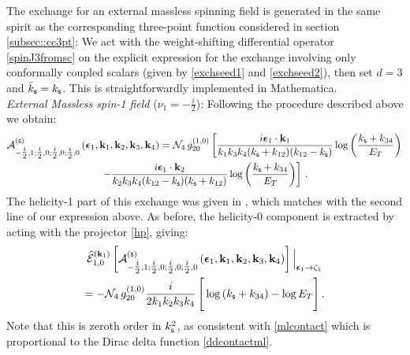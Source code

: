 \documentclass[11pt,a4paper]{article}
\begin{document}
The exchange for an external massless spinning field is generated in the same spirit as the corresponding three-point function considered in section \ref{subsec::cc3pt}: We act with the weight-shifting differential operator \eqref{spinJ3fromsc} on the explicit expression for the exchange involving only conformally coupled scalars (given by \eqref{exchseed1} and \eqref{exchseed2}), then set $d=3$ and ${\bar k}_{\sf s}=k_{\sf s}$. This is straightforwardly implemented in Mathematica. \\

\noindent \emph{External Massless spin-1 field} ($\nu_1=-\frac{i}{2}$): Following the procedure described above we obtain:
\begin{multline}
     {\cal A}^{\left({\sf s}\right)}_{-\tfrac{i}{2},1;\tfrac{i}{2},0;\tfrac{i}{2},0;\tfrac{i}{2},0}\left(\boldsymbol{\epsilon}_1, {\bf k}_1, {\bf k}_2,{\bf k}_3, {\bf k}_4\right)={\cal N}_4\,g_{20}^{(1,0)}\left[\frac{i \boldsymbol{\epsilon}_1\cdot\bold{k}_1 }{k_1 k_3 k_4 (k_{\sf s}+k_{12}) (k_{12}-k_{\sf s})}\log \left(\frac{k_{\sf s}+k_{34}}{E_T}\right)\right.\\\left.-\frac{i \boldsymbol{\epsilon}_1\cdot\bold{k}_2 }{k_2 k_3 k_4 (k_{12}-k_{\sf s}) (k_{\sf s}+k_{12})}\log \left(\frac{k_{\sf s}+k_{34}}{E_T}\right)\right]\,.
\end{multline}
The helicity-1 part of this exchange was given in \cite{Baumann:2020dch}, which matches with the second line of our expression above. As before, the helicity-0 component is extracted by acting with the projector \eqref{hp}, giving:
\begin{multline}\label{hel0-1000}
    \widehat{\mathcal{E}}_{1,0}^{(\bold{k}_1)}\left[{\cal A}^{\left({\sf s}\right)}_{-\tfrac{i}{2},1;\tfrac{i}{2},0;\tfrac{i}{2},0;\tfrac{i}{2},0}\left(\boldsymbol{\epsilon}_1, {\bf k}_1, {\bf k}_2,{\bf k}_3, {\bf k}_4\right)\right]\Big|_{\boldsymbol{\epsilon}_1 \to \zeta_1}\\=-{\cal N}_4\,g_{20}^{(1,0)}\frac{i}{2 k_1 k_2 k_3 k_4}\,\Bigg[\log \left(k_{\sf s}+k_{34}\right)-\log E_T\Bigg]\,.
\end{multline}
Note that this is zeroth order in $k^2_{\sf s}$, as consistent with \eqref{mlcontact} which is proportional to the Dirac delta function \eqref{ddcontactml}.
\end{document}
